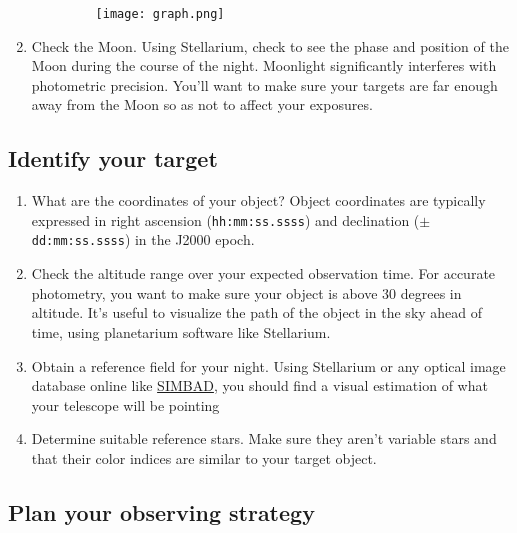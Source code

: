 \documentclass{article}
\begin{document}
\begin{enumerate}
\begin{enumerate}
					\begin{figure}[h]
						\centering
						\texttt{[image: graph.png]}
					\end{figure}

				\end{enumerate}

				\item Check the Moon. Using Stellarium, check to see the phase and position of the Moon during the course of the night. Moonlight significantly interferes with photometric precision. You'll want to make sure your targets are far enough away from the Moon so as not to affect your exposures.

				\end{enumerate}

		\subsection{Identify your target}

			\begin{enumerate}

				\item What are the coordinates of your object? Object coordinates are typically expressed in right ascension (\texttt{hh:mm:ss.ssss}) and declination (\texttt{$\pm$dd:mm:ss.ssss}) in the J2000 epoch.

				\item Check the altitude range over your expected observation time. For accurate photometry, you want to make sure your object is above 30 degrees in altitude. It's useful to visualize the path of the object in the sky ahead of time, using planetarium software like Stellarium.

				\item Obtain a reference field for your night. Using Stellarium or any optical image database online like \href{http://simbad.u-strasbg.fr/simbad/}{SIMBAD}, you should find a visual estimation of what your telescope will be pointing

				\item Determine suitable reference stars. Make sure they aren't variable stars and that their color indices are similar to your target object.

			\end{enumerate}

		\subsection{Plan your observing strategy}
\end{document}
